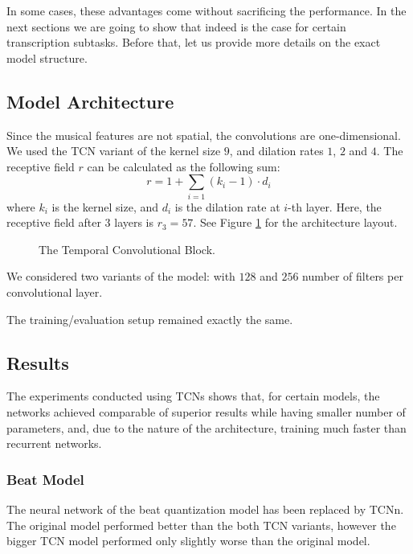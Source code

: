 In some cases, these advantages come without sacrificing the performance. In the next sections we are going to show that indeed is the case for certain transcription subtasks. Before that, let us provide more details on the exact model structure.

\subsection{Model Architecture}

Since the musical features are not spatial, the convolutions are one-dimensional. We used the TCN variant of the kernel size $9$, and dilation rates $1$, $2$ and $4$. The receptive field $r$ can be calculated as the following sum: \[r = 1 + \sum_{i=1}\left(k_i - 1\right)\cdot d_i\] where $k_i$ is the kernel size, and $d_i$ is the dilation rate at $i$-th layer. Here, the receptive field after $3$ layers is $r_3 = 57$. See Figure \ref{temporal_convolutional_network} for the architecture layout.

\begin{figure}[ht!]
\centering

\caption[The Temporal Convolutional Block.]{The Temporal Convolutional Block.}
\label{temporal_convolutional_network}
\end{figure}

We considered two variants of the model: with $128$ and $256$ number of filters per convolutional layer.

The training/evaluation setup remained exactly the same.

\subsection{Results}

The experiments conducted using TCNs shows that, for certain models, the networks achieved comparable of superior results while having smaller number of parameters, and, due to the nature of the architecture, training much faster than recurrent networks. 

\subsubsection{Beat Model}

The neural network of the beat quantization model has been replaced by TCNn. The original model performed better than the both TCN variants, however the bigger TCN model performed only slightly worse than the original model.

